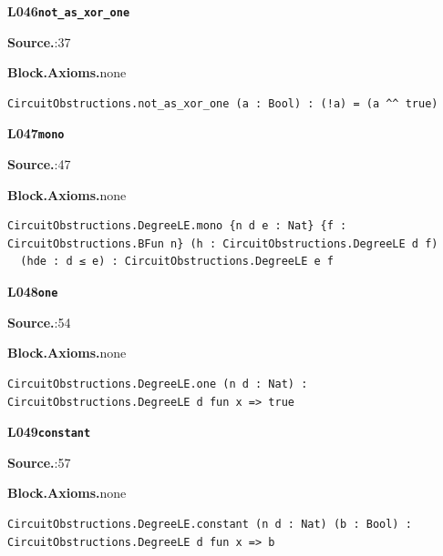 \par\medskip\noindent\begin{minipage}{\textwidth}
{\small\bfseries L046\enspace\texttt{not\_as\_xor\_one}\par}
{\footnotesize\raggedright\textbf{Source.}\enspace{}:37\par
\textbf{Block.}\quad\textbf{Axioms.}\enspace none\par}\nopagebreak
\begin{lstlisting}
CircuitObstructions.not_as_xor_one (a : Bool) : (!a) = (a ^^ true)
\end{lstlisting}
\end{minipage}\par

\par\medskip\noindent\begin{minipage}{\textwidth}
{\small\bfseries L047\enspace\texttt{mono}\par}
{\footnotesize\raggedright\textbf{Source.}\enspace{}:47\par
\textbf{Block.}\quad\textbf{Axioms.}\enspace none\par}\nopagebreak
\begin{lstlisting}
CircuitObstructions.DegreeLE.mono {n d e : Nat} {f : CircuitObstructions.BFun n} (h : CircuitObstructions.DegreeLE d f)
  (hde : d ≤ e) : CircuitObstructions.DegreeLE e f
\end{lstlisting}
\end{minipage}\par

\par\medskip\noindent\begin{minipage}{\textwidth}
{\small\bfseries L048\enspace\texttt{one}\par}
{\footnotesize\raggedright\textbf{Source.}\enspace{}:54\par
\textbf{Block.}\quad\textbf{Axioms.}\enspace none\par}\nopagebreak
\begin{lstlisting}
CircuitObstructions.DegreeLE.one (n d : Nat) : CircuitObstructions.DegreeLE d fun x => true
\end{lstlisting}
\end{minipage}\par

\par\medskip\noindent\begin{minipage}{\textwidth}
{\small\bfseries L049\enspace\texttt{constant}\par}
{\footnotesize\raggedright\textbf{Source.}\enspace{}:57\par
\textbf{Block.}\quad\textbf{Axioms.}\enspace none\par}\nopagebreak
\begin{lstlisting}
CircuitObstructions.DegreeLE.constant (n d : Nat) (b : Bool) : CircuitObstructions.DegreeLE d fun x => b
\end{lstlisting}
\end{minipage}\par

